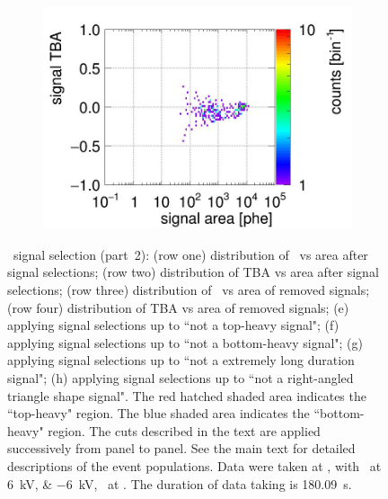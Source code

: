 \begin{landscape}
\begin{figure}[!p]
\begin{subfigure}[t]{0.32\textwidth}
			\includegraphics[width=\figurewidth,clip,trim={0 8 0 40}]{Figures/GasTest/CutsValid/res64767/tbapaX10Vecfig64767.jpg}
			\caption{}
			\label{fig:signal selection 10}
		\end{subfigure}
		\caption[\gtest\ signal selection (part~2).]{\gtest\ signal selection (part~2): 
			(row one) distribution of \rpdshort\ vs area after signal selections;
(row two) distribution of TBA vs area after signal selections;
(row three) distribution of \rpdshort\ vs area of removed signals;
(row four) distribution of TBA vs area of removed signals;
(e) applying signal selections up to ``not a top-heavy signal";
(f) applying signal selections up to ``not a bottom-heavy signal";
(g) applying signal selections up to ``not a extremely long duration signal";
(h) applying signal selections up to ``not a right-angled triangle shape signal".
The red hatched shaded area indicates the ``top-heavy" region.
The blue shaded area indicates the ``bottom-heavy" region.
		The cuts described in the text are applied successively from panel to panel. See the main text for detailed descriptions of the event populations.
		Data were taken at , with \opvtvb\ at \SIlist{+6;-6}{kV}, \opgd\ at \standarddensity . The duration of data taking is \SI{180.09}{\s}.
		}
		\label{fig:signal selection l2}
	\end{figure}
\end{landscape}
